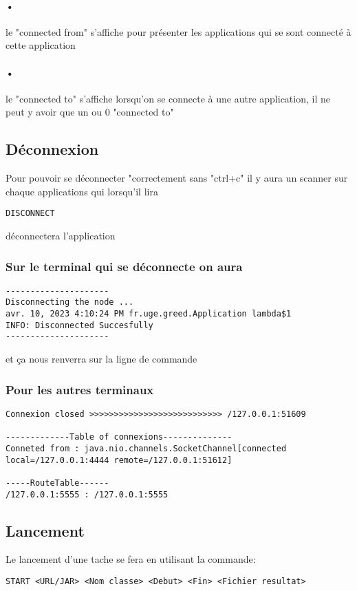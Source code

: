 \documentclass[a4paper,titlepage]{report}
\begin{document}
\paragraph{•}
le "connected from" s'affiche pour présenter les applications qui se sont connecté à cette application
\paragraph{•}
le "connected to" s'affiche lorsqu'on se connecte à une autre application, il ne peut y avoir que un ou 0 "connected to"
\subsection{Déconnexion}
Pour pouvoir se déconnecter "correctement sans "ctrl+c" il y aura un scanner sur chaque applications qui lorsqu'il lira 
\begin{lstlisting}
DISCONNECT 
\end{lstlisting}
déconnectera l'application 
\subsubsection{Sur le terminal qui se déconnecte on aura}
\begin{lstlisting}
---------------------
Disconnecting the node ...
avr. 10, 2023 4:10:24 PM fr.uge.greed.Application lambda$1
INFO: Disconnected Succesfully
---------------------
\end{lstlisting}
et ça nous renverra sur la ligne de commande
\subsubsection{Pour les autres terminaux}
\begin{lstlisting}
Connexion closed >>>>>>>>>>>>>>>>>>>>>>>>>>> /127.0.0.1:51609

-------------Table of connexions--------------
Conneted from : java.nio.channels.SocketChannel[connected local=/127.0.0.1:4444 remote=/127.0.0.1:51612]

-----RouteTable------
/127.0.0.1:5555 : /127.0.0.1:5555
\end{lstlisting}
\subsection{Lancement}
Le lancement d'une tache se fera en utilisant la commande:

\begin{lstlisting}
START <URL/JAR> <Nom classe> <Debut> <Fin> <Fichier resultat>
\end{lstlisting}
\end{document}
